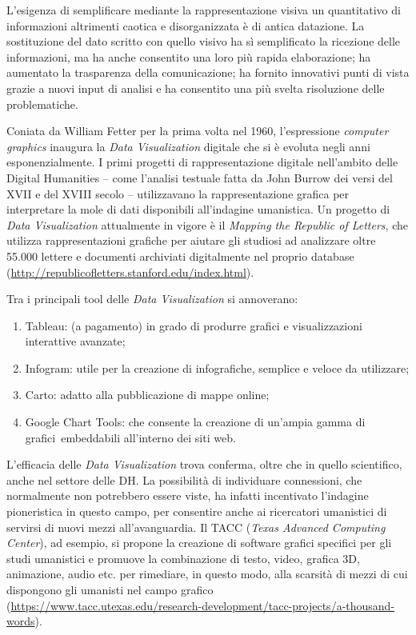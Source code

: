 L'esigenza di semplificare mediante la rappresentazione visiva un
quantitativo di informazioni altrimenti caotica e disorganizzata è di
antica datazione. La sostituzione del dato scritto con quello visivo ha
sì semplificato la ricezione delle informazioni, ma ha anche consentito
una loro più rapida elaborazione; ha aumentato la trasparenza della
comunicazione; ha fornito innovativi punti di vista grazie a nuovi input
di analisi e ha consentito una più svelta risoluzione delle
problematiche.

Coniata da William Fetter per la prima volta nel 1960, l'espressione
\emph{computer} \emph{graphics} inaugura la \emph{Data Visualization}
digitale che si è evoluta negli anni esponenzialmente. I primi progetti
di rappresentazione digitale nell'ambito delle Digital Humanities --
come l'analisi testuale fatta da John Burrow dei versi del XVII e del
XVIII secolo -- utilizzavano la rappresentazione grafica per
interpretare la mole di dati disponibili all'indagine umanistica. Un
progetto di \emph{Data Visualization} attualmente in vigore è il
\emph{Mapping the Republic of Letters}, che utilizza rappresentazioni
grafiche per aiutare gli studiosi ad analizzare oltre 55.000 lettere e
documenti archiviati digitalmente nel proprio database
(\url{http://republicofletters.stanford.edu/index.html}).

Tra i principali tool delle \emph{Data Visualization} si annoverano:

\begin{enumerate}
\def\labelenumi{\arabic{enumi}.}
\item
  Tableau: (a pagamento) in grado di produrre grafici e visualizzazioni
  interattive avanzate;
\item
  Infogram: utile per la creazione di infografiche, semplice e veloce da
  utilizzare;
\item
  Carto: adatto alla pubblicazione di mappe online;
\item
  Google Chart Tools: che consente la creazione di un'ampia gamma di
  grafici~embeddabili all'interno dei siti web.
\end{enumerate}

L'efficacia delle \emph{Data Visualization} trova conferma, oltre che in
quello scientifico, anche nel settore delle DH. La possibilità di
individuare connessioni, che normalmente non potrebbero essere viste, ha
infatti incentivato l'indagine pioneristica in questo campo, per
consentire anche ai ricercatori umanistici di servirsi di nuovi mezzi
all'avanguardia. Il TACC (\emph{Texas Advanced Computing Center}), ad
esempio, si propone la creazione di software grafici specifici per gli
studi umanistici e promuove la combinazione di testo, video, grafica 3D,
animazione, audio etc. per rimediare, in questo modo, alla scarsità di
mezzi di cui dispongono gli umanisti nel campo grafico
(\url{https://www.tacc.utexas.edu/research-development/tacc-projects/a-thousand-words}).

